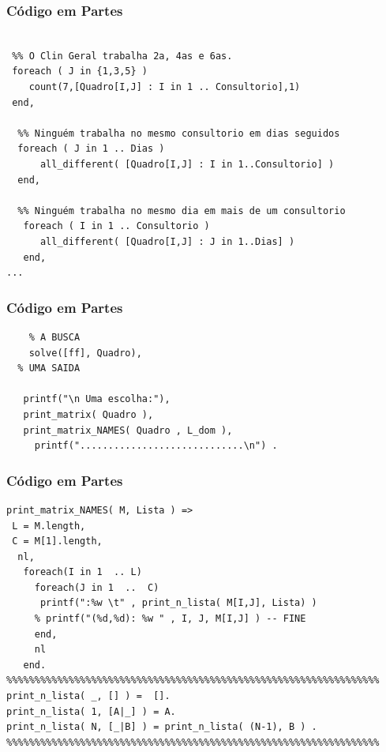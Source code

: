 \documentclass{beamer}
\begin{document}
\begin{frame}[fragile] 

\frametitle{Código em Partes}

\begin{footnotesize}
\begin{verbatim}

 %% O Clin Geral trabalha 2a, 4as e 6as.
 foreach ( J in {1,3,5} )
    count(7,[Quadro[I,J] : I in 1 .. Consultorio],1) 
 end, 
  
  %% Ninguém trabalha no mesmo consultorio em dias seguidos
  foreach ( J in 1 .. Dias )
      all_different( [Quadro[I,J] : I in 1..Consultorio] )
  end,  
 
  %% Ninguém trabalha no mesmo dia em mais de um consultorio
   foreach ( I in 1 .. Consultorio )
      all_different( [Quadro[I,J] : J in 1..Dias] )
   end,  
...  
\end{verbatim}
\end{footnotesize}
    
\end{frame}
\begin{frame}[fragile] 

\frametitle{Código em Partes}

\begin{footnotesize}
\begin{verbatim}
	% A BUSCA
	solve([ff], Quadro),
  % UMA SAIDA
	
   printf("\n Uma escolha:"),
   print_matrix( Quadro ),
   print_matrix_NAMES( Quadro , L_dom ),
	 printf(".............................\n") .
\end{verbatim}
\end{footnotesize}
    
\end{frame}
\begin{frame}[fragile] 

\frametitle{Código em Partes}

\begin{footnotesize}
\begin{verbatim}
print_matrix_NAMES( M, Lista ) =>
 L = M.length,
 C = M[1].length,
  nl,
   foreach(I in 1  .. L)
     foreach(J in 1  ..  C)
      printf(":%w \t" , print_n_lista( M[I,J], Lista) )
     % printf("(%d,%d): %w " , I, J, M[I,J] ) -- FINE
     end,
     nl
   end.
%%%%%%%%%%%%%%%%%%%%%%%%%%%%%%%%%%%%%%%%%%%%%%%%%%%%%%%%%%%%%%%%%%
print_n_lista( _, [] ) =  [].
print_n_lista( 1, [A|_] ) = A.
print_n_lista( N, [_|B] ) = print_n_lista( (N-1), B ) .
%%%%%%%%%%%%%%%%%%%%%%%%%%%%%%%%%%%%%%%%%%%%%%%%%%%%%%%%%%%%%%%%%%
\end{verbatim}
\end{footnotesize}
    
\end{frame}
\end{document}
